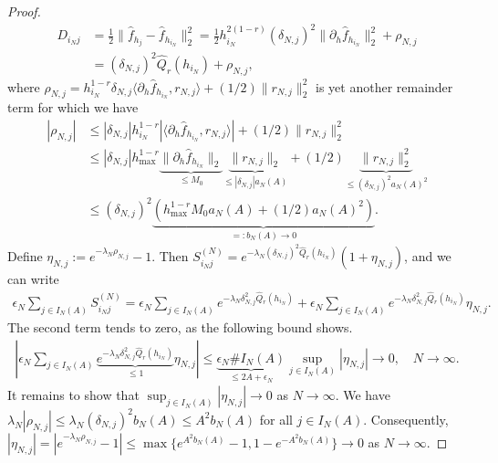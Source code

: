 \begin{proof}
\begin{equation}
        \begin{aligned}\label{eq:help_equation_000202}
            D_{i_Nj}&=\frac{1}{2}\|\hat{f}_{h_j}-\hat{f}_{h_{i_N}}\|_2^2=\frac{1}{2}h_{i_N}^{2(1-r)}(\delta_{N,j})^2\|\partial_h\hat{f}_{h_{i_N}}\|_2^2+\rho_{N,j}\\&
            =(\delta_{N,j})^2\hat{Q}_r(h_{i_N})+\rho_{N,j},
        \end{aligned}
    \end{equation}
    where $\rho_{N,j}=h_{i_N}^{1-r}\delta_{N,j}\langle\partial_h\hat{f}_{h_{i_N}},r_{N,j}\rangle+(1/2)\|r_{N,j}\|_2^2$ is yet another remainder term for which we have
    \begin{equation}
        \begin{aligned}\label{eq:help_equation_000203}
            |\rho_{N,j}|&\le|\delta_{N,j}|h_{i_N}^{1-r}|\langle\partial_h\hat{f}_{h_{i_N}},r_{N,j}\rangle|+(1/2)\|r_{N,j}\|_2^2\\&
            \le|\delta_{N,j}|h_{\max}^{1-r}\underbrace{\|\partial_h\hat{f}_{h_{i_N}}\|_2}_{\le M_0}\underbrace{\|r_{N,j}\|_2}_{\le|\delta_{N,j}|a_N(A)}+(1/2)\underbrace{\|r_{N,j}\|_2^2}_{\le(\delta_{N,j})^2a_N(A)^2}\\&
            \le(\delta_{N,j})^2\underbrace{\left(h_{\max}^{1-r}M_0a_N(A)+(1/2)a_N(A)^2\right)}_{=:b_N(A)\to0}.
        \end{aligned}
    \end{equation}
    Define $\eta_{N,j}:=e^{-\lambda_N\rho_{N,j}}-1$. Then $S_{i_Nj}^{(N)}=e^{-\lambda_N(\delta_{N,j})^2\hat{Q}_r(h_{i_N})}(1+\eta_{N,j})$, and we can write
    \begin{align}\label{eq:local_sum_approx}
        \epsilon_N\sum_{j\in I_N(A)}S_{i_Nj}^{(N)}=\epsilon_N\sum_{j\in I_N(A)}e^{-\lambda_N\delta_{N,j}^2\hat{Q}_r(h_{i_N})}+\epsilon_N\sum_{j\in I_N(A)}e^{-\lambda_N\delta_{N,j}^2\hat{Q}_r(h_{i_N})}\eta_{N,j}.
    \end{align}
    The second term tends to zero, as the following bound shows.
    \begin{align}\label{eq:local_error_bound}
        \left|\epsilon_N\sum_{j\in I_N(A)}\underbrace{e^{-\lambda_N\delta_{N,j}^2\hat{Q}_r(h_{i_N})}}_{\le 1}\eta_{N,j}\right|\le\underbrace{\epsilon_N\#I_N(A)}_{\le2A+\epsilon_N}\sup_{j\in I_N(A)}|\eta_{N,j}|\to0,\quad N\to\infty.
    \end{align}
    It remains to show that $\sup_{j\in I_N(A)}|\eta_{N,j}|\to0$ as $N\to\infty$. We have $\lambda_N|\rho_{N,j}|\le\lambda_N(\delta_{N,j})^2b_N(A)\le A^2b_N(A)$ for all $j\in I_N(A)$. Consequently, $|\eta_{N,j}|=|e^{-\lambda_N\rho_{N,j}}-1|\le\max\{e^{A^2b_N(A)}-1,1-e^{-A^2b_N(A)}\}\to0$ as $N\to\infty$.


\end{proof}
